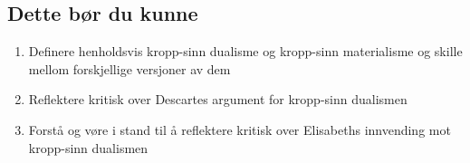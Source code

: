 \documentclass[11pt, a4paper]{article}
\begin{document}
\subsection{Dette bør du kunne}

\begin{enumerate}
    \item Definere henholdsvis kropp-sinn dualisme og kropp-sinn materialisme og skille mellom forskjellige versjoner av dem
    \item Reflektere kritisk over Descartes argument for kropp-sinn dualismen
    \item Forstå og vøre i stand til å reflektere kritisk over Elisabeths innvending mot kropp-sinn dualismen
\end{enumerate}
\end{document}
